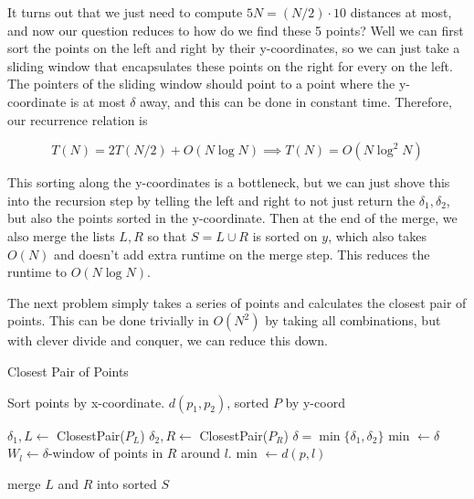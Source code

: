   It turns out that we just need to compute $5N = (N/2) \cdot 10$ distances at most, and now our question reduces to how do we find these 5 points? Well we can first sort the points on the left and right by their y-coordinates, so we can just take a sliding window that encapsulates these points on the right for every on the left. The pointers of the sliding window should point to a point where the y-coordinate is at most $\delta$ away, and this can be done in constant time. Therefore, our recurrence relation is  

  \begin{equation}
    T(N) = 2 T(N/2) + O(N \log{N}) \implies T(N) = O(N \log^2 {N})
  \end{equation}
  
  This sorting along the y-coordinates is a bottleneck, but we can just shove this into the recursion step by telling the left and right to not just return the $\delta_1, \delta_2$, but also the points sorted in the y-coordinate. Then at the end of the merge, we also merge the lists $L, R$ so that $S = L \cup R$ is sorted on $y$, which also takes $O(N)$ and doesn't add extra runtime on the merge step. This reduces the runtime to $O(N \log{N})$. 

  \begin{algo}
    The next problem simply takes a series of points and calculates the closest pair of points. This can be done trivially in $O(N^2)$ by taking all combinations, but with clever divide and conquer, we can reduce this down. 
    \begin{algorithm}[H]
      \caption{Closest Pair of Points}
      \label{alg:closest_pair}
      \begin{algorithmic}
        \State 
          \State Sort points by x-coordinate. 
            \State \Return $d(p_1, p_2)$, sorted $P$ by y-coord
          \EndIf

          \State $\delta_1, L \gets$ ClosestPair($P_L$)
          \State $\delta_2, R \gets$ ClosestPair($P_R$)
          \State $\delta = \min\{\delta_1, \delta_2\}$ 
          \State min $\gets \delta$
           
            \State $W_l \gets \delta$-window of points in $R$ around $l$. 
             
                \State min $\gets d(p, l)$
              \EndIf
            \EndFor
          \EndFor

          \State merge $L$ and $R$ into sorted $S$  

          \State {}
        \EndFunction
      \end{algorithmic}
    \end{algorithm}
  \end{algo}

